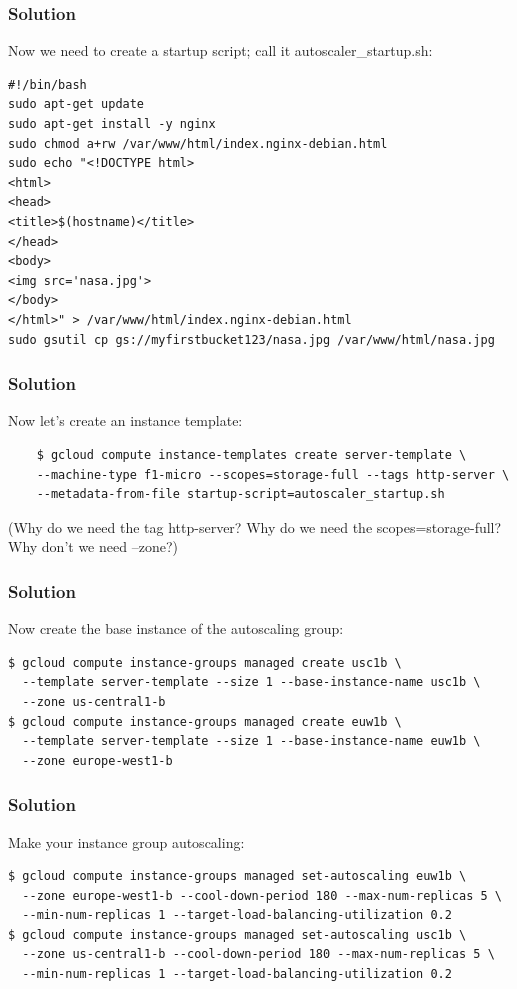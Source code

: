 \documentclass[9pt]{beamer}
\begin{document}
\begin{frame}[fragile]
  \frametitle{Solution}
  Now we need to create a startup script; call it autoscaler\_startup.sh:
  \begin{verbatim}
#!/bin/bash
sudo apt-get update
sudo apt-get install -y nginx
sudo chmod a+rw /var/www/html/index.nginx-debian.html
sudo echo "<!DOCTYPE html>
<html>
<head>
<title>$(hostname)</title>
</head>
<body>
<img src='nasa.jpg'>
</body>
</html>" > /var/www/html/index.nginx-debian.html
sudo gsutil cp gs://myfirstbucket123/nasa.jpg /var/www/html/nasa.jpg
  \end{verbatim}
\end{frame}

\begin{frame}[fragile]
  \frametitle{Solution}
  Now let's create an instance template:
  \begin{verbatim}
    $ gcloud compute instance-templates create server-template \
    --machine-type f1-micro --scopes=storage-full --tags http-server \
    --metadata-from-file startup-script=autoscaler_startup.sh
  \end{verbatim}
  (Why do we need the tag http-server? Why do we need the scopes=storage-full? Why don't we need --zone?)
\end{frame}

\begin{frame}[fragile]
  \frametitle{Solution}
  Now create the base instance of the autoscaling group:
  \begin{verbatim}
$ gcloud compute instance-groups managed create usc1b \
  --template server-template --size 1 --base-instance-name usc1b \
  --zone us-central1-b
$ gcloud compute instance-groups managed create euw1b \
  --template server-template --size 1 --base-instance-name euw1b \
  --zone europe-west1-b
  \end{verbatim}
\end{frame}

\begin{frame}[fragile]
  \frametitle{Solution}
    Make your instance group autoscaling:
    \begin{verbatim}
$ gcloud compute instance-groups managed set-autoscaling euw1b \
  --zone europe-west1-b --cool-down-period 180 --max-num-replicas 5 \
  --min-num-replicas 1 --target-load-balancing-utilization 0.2      
$ gcloud compute instance-groups managed set-autoscaling usc1b \
  --zone us-central1-b --cool-down-period 180 --max-num-replicas 5 \
  --min-num-replicas 1 --target-load-balancing-utilization 0.2
  \end{verbatim}
\end{frame}
\end{document}
